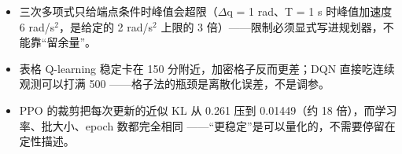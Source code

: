 \documentclass[11pt,a4paper]{ctexart}
\begin{document}
\begin{itemize}[leftmargin=1.6em,itemsep=0.15em,topsep=0.25em]

\item 三次多项式只给端点条件时峰值会超限（$\Delta$q = 1 rad、T = 1 s 时峰值加速度 6 rad/s$^{2}$，是给定的 2 rad/s$^{2}$ 上限的 3 倍）——限制必须显式写进规划器，不能靠“留余量”。

\item 表格 Q-learning 稳定卡在 150 分附近，加密格子反而更差；DQN 直接吃连续观测可以打满 500 ——格子法的瓶颈是离散化误差，不是调参。

\item PPO 的裁剪把每次更新的近似 KL 从 0.261 压到 0.01449（约 18 倍），而学习率、批大小、epoch 数都完全相同 ——“更稳定”是可以量化的，不需要停留在定性描述。

\end{itemize}
\end{document}
